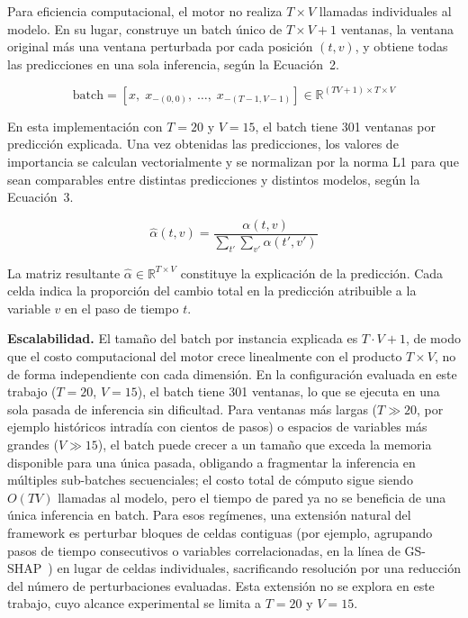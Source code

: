 \documentclass[conference, letterpaper]{IEEEtran}
\begin{document}
Para eficiencia computacional, el motor no realiza $T \times V$
llamadas individuales al modelo. En su lugar, construye un batch
único de $T \times V + 1$ ventanas, la ventana original más una
ventana perturbada por cada posición $(t, v)$, y obtiene todas
las predicciones en una sola inferencia, según la Ecuación~2.

\begin{equation}
    \text{batch} = \left[ x,\; x_{-(0,0)},\; \ldots,\; 
    x_{-(T-1,V-1)} \right] \in 
    \mathbb{R}^{(TV+1) \times T \times V}
\end{equation}

En esta implementación con $T=20$ y $V=15$, el batch tiene
301 ventanas por predicción explicada. Una vez obtenidas las
predicciones, los valores de importancia se calculan
vectorialmente y se normalizan por la norma L1 para que sean
comparables entre distintas predicciones y distintos modelos,
según la Ecuación~3.

\begin{equation}
    \hat{\alpha}(t, v) = \frac{\alpha(t, v)}
    {\sum_{t'}\sum_{v'} \alpha(t', v')}
\end{equation}

La matriz resultante $\hat{\alpha} \in \mathbb{R}^{T \times V}$ 
constituye la explicación de la predicción. Cada celda indica 
la proporción del cambio total en la predicción atribuible a 
la variable $v$ en el paso de tiempo $t$.

\textbf{Escalabilidad.} El tamaño del batch por instancia
explicada es $T \cdot V + 1$, de modo que el costo computacional
del motor crece linealmente con el producto $T \times V$, no de
forma independiente con cada dimensión. En la configuración
evaluada en este trabajo ($T{=}20$, $V{=}15$), el batch tiene 301
ventanas, lo que se ejecuta en una sola pasada de inferencia sin
dificultad. Para ventanas más largas ($T \gg 20$, por ejemplo
históricos intradía con cientos de pasos) o espacios de variables
más grandes ($V \gg 15$), el batch puede crecer a un tamaño que
exceda la memoria disponible para una única pasada, obligando a
fragmentar la inferencia en múltiples sub-batches secuenciales; el
costo total de cómputo sigue siendo $O(TV)$ llamadas al modelo,
pero el tiempo de pared ya no se beneficia de una única inferencia
en batch. Para esos regímenes, una extensión natural del framework
es perturbar bloques de celdas contiguas (por ejemplo, agrupando
pasos de tiempo consecutivos o variables correlacionadas, en la
línea de GS-SHAP~\cite{gsshap2026}) en lugar de celdas
individuales, sacrificando resolución por una reducción del número
de perturbaciones evaluadas. Esta extensión no se explora en este
trabajo, cuyo alcance experimental se limita a $T{=}20$ y $V{=}15$.
\end{document}
